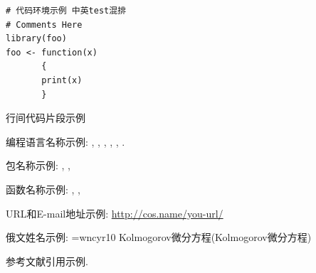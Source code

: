 \documentclass{cosart}
\begin{document}
\begin{Verbatim}
# 代码环境示例 中英test混排
# Comments Here
library(foo)
foo <- function(x)
       {
       print(x)
       }
\end{Verbatim}

行间代码片段示例

编程语言名称示例:
\R , , , , , .

包名称示例:
, , 

函数名称示例:
, , 

URL和E-mail地址示例: \url{http://cos.name/you-url/} 

俄文姓名示例: \font\fontWCA=wncyr10 {\fontWCA Kolmogorov}微分方程(Kolmogorov微分方程)

参考文献\citep{zhaokaihua1995}引用示例.

\nocite{*} %

\end{document}

